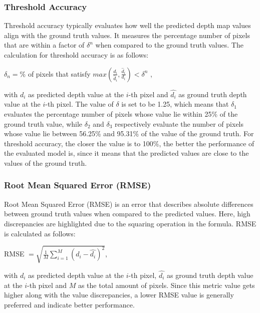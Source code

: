 \subsubsection{Threshold Accuracy}

Threshold accuracy typically evaluates how well the predicted depth map values align with the ground truth values. It measures the percentage number of pixels that are within a factor of \(\delta^n\) when compared to the ground truth values. The calculation for threshold accuracy is as follows:

\begin{center}
    \(\delta_n = \%\) of pixels that satisfy \(max (\frac{d_i}{\hat{d}_i}, \frac{\hat{d}_i}{d_i}) < \delta^n\) \parencite{ZoeDepth},
\end{center}
with \(d_i\) as predicted depth value at the \(i\)-th pixel and \(\hat{d_i}\) as ground truth depth value at the \(i\)-th pixel. The value of \(\delta\) is set to be 1.25, which means that \(\delta_1\) evaluates the percentage number of pixels whose value lie within 25\% of the ground truth value, while \(\delta_2\) and \(\delta_3\) respectively evaluate the number of pixels whose value lie between 56.25\% and 95.31\% of the value of the ground truth. For threshold accuracy, the closer the value is to 100\%, the better the performance of the evaluated model is, since it means that the predicted values are close to the values of the ground truth.

\subsubsection{Root Mean Squared Error (RMSE)}

Root Mean Squared Error (RMSE) is an error that describes absolute differences between ground truth values when compared to the predicted values. Here, high discrepancies are highlighted due to the squaring operation in the formula. RMSE is calculated as follows:

\begin{center}
    RMSE \(= \sqrt{\frac{1}{M} \sum\limits_{i = 1}^{M} (d_i - \hat{d_i})^2}\),
\end{center}
with \(d_i\) as predicted depth value at the \(i\)-th pixel, \(\hat{d_i}\) as ground truth depth value at the \(i\)-th pixel and \(M\) as the total amount of pixels. Since this metric value gets higher along with the value discrepancies, a lower RMSE value is generally preferred and indicate better performance. 

